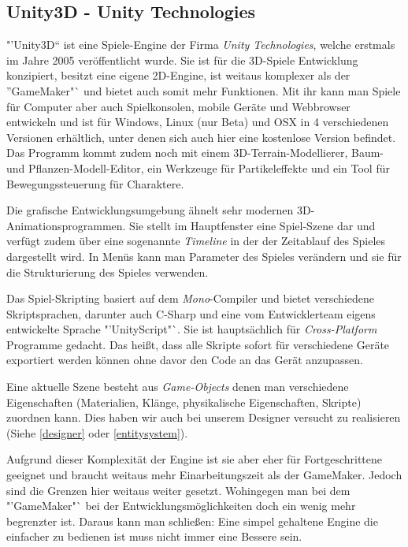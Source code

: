 \subsection{Unity3D - Unity Technologies}

"'Unity3D"` ist eine Spiele-Engine der Firma \textit{Unity Technologies}, welche erstmals im Jahre 2005 veröffentlicht wurde. Sie ist für die 3D-Spiele Entwicklung konzipiert, besitzt eine eigene 2D-Engine, ist weitaus komplexer als der "'GameMaker"` und bietet auch somit mehr Funktionen. Mit ihr kann man Spiele für Computer aber auch Spielkonsolen, mobile Geräte und Webbrowser entwickeln und ist für Windows, Linux (nur Beta) und OSX in 4 verschiedenen Versionen erhältlich, unter denen sich auch hier eine kostenlose Version befindet. Das Programm kommt zudem noch mit einem 3D-Terrain-Modellierer, Baum- und Pflanzen-Modell-Editor, ein Werkzeuge für Partikeleffekte und ein Tool für Bewegungssteuerung für Charaktere.

Die grafische Entwicklungsumgebung ähnelt sehr modernen 3D-Animationsprogrammen. Sie stellt im Hauptfenster eine Spiel-Szene dar und verfügt zudem über eine sogenannte \textit{Timeline} in der der Zeitablauf des Spieles dargestellt wird. In Menüs kann man Parameter des Spieles verändern und sie für die Strukturierung des Spieles verwenden. 

Das Spiel-Skripting basiert auf dem \textit{Mono}-Compiler und bietet verschiedene Skriptsprachen, darunter auch C-Sharp und eine vom Entwicklerteam eigens entwickelte Sprache "'UnityScript"`. Sie ist hauptsächlich für \textit{Cross-Platform} Programme gedacht. Das heißt, dass alle Skripte sofort für verschiedene Geräte exportiert werden können ohne davor den Code an das Gerät anzupassen.

Eine aktuelle Szene besteht aus \textit{Game-Objects} denen man verschiedene Eigenschaften (Materialien, Klänge, physikalische Eigenschaften, Skripte) zuordnen kann. Dies haben wir auch bei unserem Designer versucht zu realisieren (Siehe \ref{designer} oder \ref{entitysystem}).

Aufgrund dieser Komplexität der Engine ist sie aber eher für Fortgeschrittene geeignet und braucht weitaus mehr Einarbeitungszeit als der GameMaker. Jedoch sind die Grenzen hier weitaus weiter gesetzt. Wohingegen man bei dem "'GameMaker"` bei der Entwicklungsmöglichkeiten doch ein wenig mehr begrenzter ist.
Daraus kann man schließen: Eine simpel gehaltene Engine die einfacher zu bedienen ist muss nicht immer eine Bessere sein.
